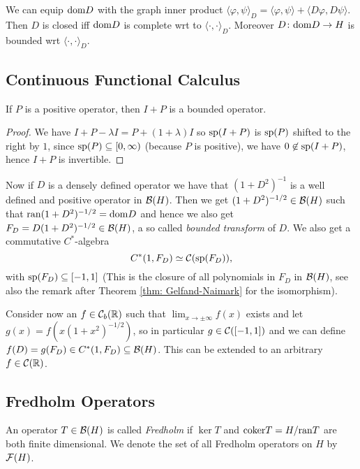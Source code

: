 \noindent We can equip $\dom D$ with the graph inner product $\langle\varphi,\psi\rangle_D=\langle\varphi,\psi\rangle+\langle D\varphi,D\psi\rangle$. Then $D$ is closed iff $\dom D$ is complete wrt to $\langle\cdot,\cdot\rangle_D$. Moreover $D\colon\dom D\to H$ is bounded wrt $\langle\cdot,\cdot\rangle_D$. 

\subsection{Continuous Functional Calculus}
\begin{lemma}
 If $P$ is a positive operator, then $I+P$ is a bounded operator.
\end{lemma}
\begin{proof}
 We have $I+P-\lambda I=P+(1+\lambda) I$ so $\sp(I+P)$ is $\sp(P)$ shifted to the right by $1$, since $\sp(P)\subseteq[0,\infty)$ (because $P$ is positive), we have $0\not\in\sp(I+P)$, hence $I+P$ is invertible.
\end{proof}



\noindent Now if $D$ is a densely defined operator we have that $(1+D^2)^{-1}$ is a well defined and positive operator in $\B(H)$. Then we get $(1+D^2)^{-1/2}\in\B(H)$ such that $\ran(1+D^2)^{-1/2}=\dom D$ and hence we also get $F_D=D(1+D^2)^{-1/2}\in\B(H)$, a so called \emph{bounded transform} of $D$. We also get a commutative $C^\ast$-algebra $$C^\ast(1,F_D)\simeq\Co(\sp(F_D)),$$ with $\sp(F_D)\subseteq [-1,1]$ (This is the closure of all polynomials in $F_D$ in $\B(H)$, see also the remark after Theorem \eqref{thm: Gelfand-Naimark} for the isomorphism). 

\noindent Consider now an $f\in\Co_b(\Bbb R)$ such that $\lim_{x\to\pm\infty}f(x)$ exists and let $g(x)=f(x(1+x^2)^{-1/2})$, so in particular $g\in\Co([-1,1])$ and we can define $f(D)=g(F_D)\in C^\ast(1,F_D)\subseteq\B(H)$. This can be extended to an arbitrary $f\in\Co(\R)$. 

\subsection{Fredholm Operators}
\begin{definition}
 An operator $T\in\B(H)$ is called \emph{Fredholm} if $\ker T$ and $\coker T=H/\ran T$ are both finite dimensional. We denote the set of all Fredholm operators on $H$ by $\F(H)$.
\end{definition}

